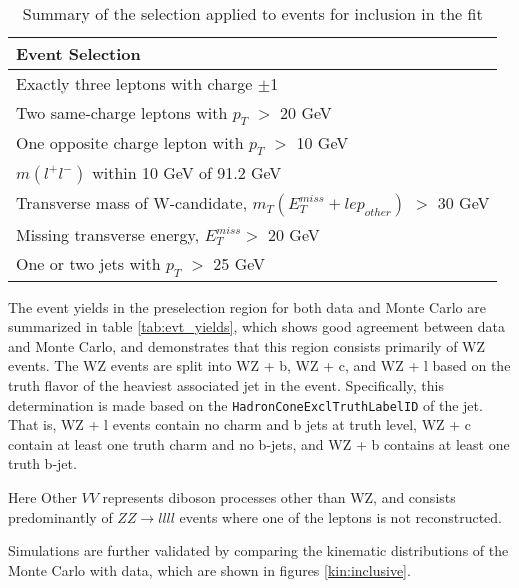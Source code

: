 \begin{table}[H]
    \centering
    \begin{tabular}{l}
        \hline\hline
        Event Selection\\
        \hline 
        Exactly three leptons with charge $\pm$1 \\
        Two same-charge leptons with $p_T$ $>$ 20 GeV \\
        One opposite charge lepton with $p_T$ $>$ 10 GeV \\
        $m(l^+l^-)$ within 10 GeV of 91.2 GeV \\
        Transverse mass of W-candidate, $m_T(E_T^{miss} + lep_{other})$ $>$ 30 GeV \\
        Missing transverse energy, $E_T^{miss} >$ 20 GeV \\
        One or two jets with $p_T$ $>$ 25 GeV \\
        \hline\hline
    \end{tabular}
    \caption{Summary of the selection applied to events for inclusion in the fit}
    \label{tbl:selection}
\end{table}

The event yields in the preselection region for both data and Monte Carlo are summarized in table \ref{tab:evt_yields}, which shows good agreement between data and Monte Carlo, and demonstrates that this region consists primarily of WZ events. The WZ events are split into WZ + b, WZ + c, and WZ + l based on the truth flavor of the heaviest associated jet in the event. Specifically, this determination is made based on the \verb!HadronConeExclTruthLabelID! of the jet. That is, WZ + l events contain no charm and b jets at truth level, WZ + c contain at least one truth charm and no b-jets, and WZ + b contains at least one truth b-jet. 

\begin{table}[H]
    \centering
        
    \label{tab:evt_yields}
\end{table}

Here Other $VV$ represents diboson processes other than WZ, and consists predominantly of $ZZ\rightarrow llll$ events where one of the leptons is not reconstructed.

Simulations are further validated by comparing the kinematic distributions of the Monte Carlo with data, which are shown in figures \ref{kin:inclusive}.

